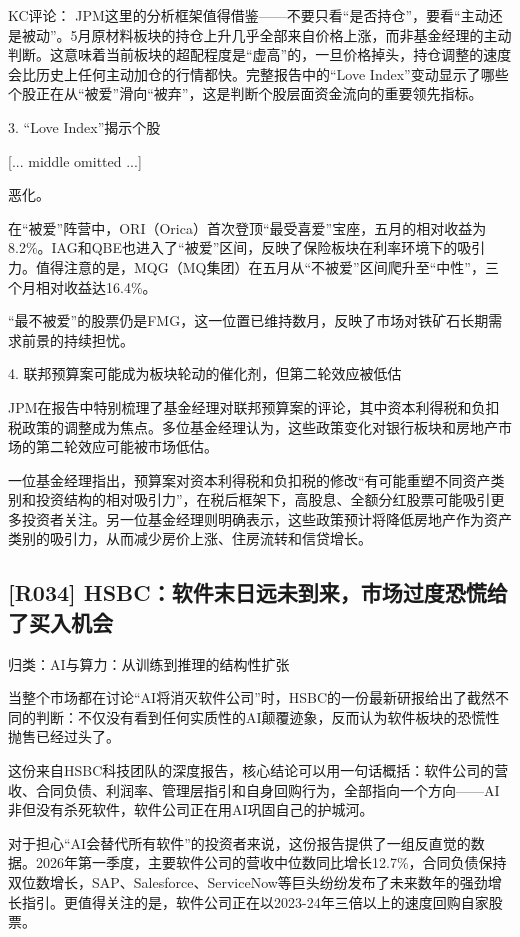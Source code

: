 \documentclass[11pt]{ctexart}
\begin{document}
KC评论： JPM这里的分析框架值得借鉴——不要只看“是否持仓”，要看“主动还是被动”。5月原材料板块的持仓上升几乎全部来自价格上涨，而非基金经理的主动判断。这意味着当前板块的超配程度是“虚高”的，一旦价格掉头，持仓调整的速度会比历史上任何主动加仓的行情都快。完整报告中的“Love Index”变动显示了哪些个股正在从“被爱”滑向“被弃”，这是判断个股层面资金流向的重要领先指标。

3. “Love Index”揭示个股

[... middle omitted ...]

恶化。

在“被爱”阵营中，ORI（Orica）首次登顶“最受喜爱”宝座，五月的相对收益为8.2\%。IAG和QBE也进入了“被爱”区间，反映了保险板块在利率环境下的吸引力。值得注意的是，MQG（MQ集团）在五月从“不被爱”区间爬升至“中性”，三个月相对收益达16.4\%。

“最不被爱”的股票仍是FMG，这一位置已维持数月，反映了市场对铁矿石长期需求前景的持续担忧。

4. 联邦预算案可能成为板块轮动的催化剂，但第二轮效应被低估

JPM在报告中特别梳理了基金经理对联邦预算案的评论，其中资本利得税和负扣税政策的调整成为焦点。多位基金经理认为，这些政策变化对银行板块和房地产市场的第二轮效应可能被市场低估。

一位基金经理指出，预算案对资本利得税和负扣税的修改“有可能重塑不同资产类别和投资结构的相对吸引力”，在税后框架下，高股息、全额分红股票可能吸引更多投资者关注。另一位基金经理则明确表示，这些政策预计将降低房地产作为资产类别的吸引力，从而减少房价上涨、住房流转和信贷增长。

\subsection{[R034] HSBC：软件末日远未到来，市场过度恐慌给了买入机会}
{\small\color{refgray}归类：AI与算力：从训练到推理的结构性扩张}

当整个市场都在讨论“AI将消灭软件公司”时，HSBC的一份最新研报给出了截然不同的判断：不仅没有看到任何实质性的AI颠覆迹象，反而认为软件板块的恐慌性抛售已经过头了。

这份来自HSBC科技团队的深度报告，核心结论可以用一句话概括：软件公司的营收、合同负债、利润率、管理层指引和自身回购行为，全部指向一个方向——AI非但没有杀死软件，软件公司正在用AI巩固自己的护城河。

对于担心“AI会替代所有软件”的投资者来说，这份报告提供了一组反直觉的数据。2026年第一季度，主要软件公司的营收中位数同比增长12.7\%，合同负债保持双位数增长，SAP、Salesforce、ServiceNow等巨头纷纷发布了未来数年的强劲增长指引。更值得关注的是，软件公司正在以2023-24年三倍以上的速度回购自家股票。
\end{document}
